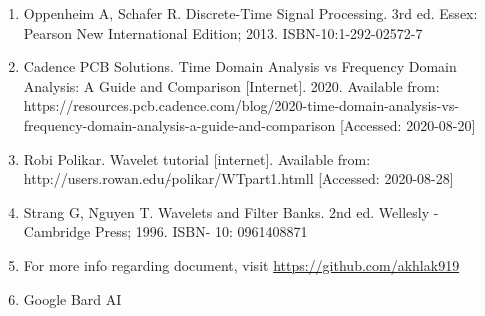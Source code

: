 \documentclass[12pt, a4paper]{article} %
\begin{document}
\begin{enumerate}
    \item Oppenheim A, Schafer R. Discrete-Time Signal Processing. 3rd ed. Essex: Pearson New International Edition; 2013. ISBN-10:1-292-02572-7
    \item Cadence PCB Solutions. Time Domain Analysis vs Frequency Domain Analysis: A Guide and Comparison [Internet]. 2020. Available from: https://resources.pcb.cadence.com/blog/2020-time-domain-analysis-vs-frequency-domain-analysis-a-guide-and-comparison [Accessed: 2020-08-20]
    \item Robi Polikar. Wavelet tutorial [internet]. Available from: http://users.rowan.edu/$\tilde{}$polikar/WTpart1.htmll [Accessed: 2020-08-28]
    \item Strang G, Nguyen T. Wavelets and Filter Banks. 2nd ed. Wellesly - Cambridge Press; 1996. ISBN- 10: 0961408871
    \item For more info regarding document, visit \url{https://github.com/akhlak919}
    \item Google Bard AI
\end{enumerate}
\end{document}
